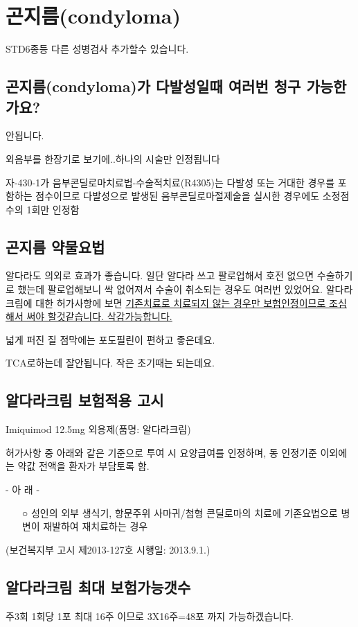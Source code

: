 \section{곤지름(condyloma)}
%
{STD6종등 다른 성병검사 추가할수 있습니다.\par }
\subsection{곤지름(condyloma)가 다발성일때 여러번 청구 가능한가요?}
안됩니다.\par
외음부를 한장기로 보기에..하나의 시술만 인정됩니다\par
자-430-1가 음부콘딜로마치료법-수술적치료(R4305)는 다발성 또는 거대한 경우를 포함하는 점수이므로 다발성으로 발생된 음부콘딜로마절제술을 실시한 경우에도 소정점수의 1회만 인정함
\subsection{곤지름 약물요법}
알다라도 의외로 효과가 좋습니다. 일단 알다라 쓰고 팔로업해서 호전 없으면 수술하기로 했는데 팔로업해보니 싹 없어져서 수술이 취소되는 경우도 여러번 있었어요. 알다라 크림에 대한 허가사항에 보면 \uline{기존치료로 치료되지 않는 경우만 보험인정이므로 조심해서 써야 할것같습니다. 삭감가능합니다.}\par
넓게 퍼진 질 점막에는 포도필린이 편하고 좋은데요.\par 
TCA로하는데 잘안됩니다. 작은 초기때는 되는데요.
\subsection{알다라크림 보험적용 고시}
Imiquimod 12.5mg 외용제(품명: 알다라크림) \par
허가사항 중 아래와 같은 기준으로 투여 시 요양급여를 인정하며, 동 인정기준  이외에는 약값 전액을 환자가 부담토록 함. \par
- 아 래 -
\begin{itemize}\tightlist
\item[○] 성인의 외부 생식기, 항문주위 사마귀/첨형 콘딜로마의 치료에 기존요법으로 
병변이 재발하여 재치료하는 경우
\end{itemize}
(보건복지부 고시 제2013-127호 시행일: 2013.9.1.)

\subsection{알다라크림 최대 보험가능갯수}
주3회 1회당 1포 최대 16주 이므로 3X16주=48포 까지 가능하겠습니다.
